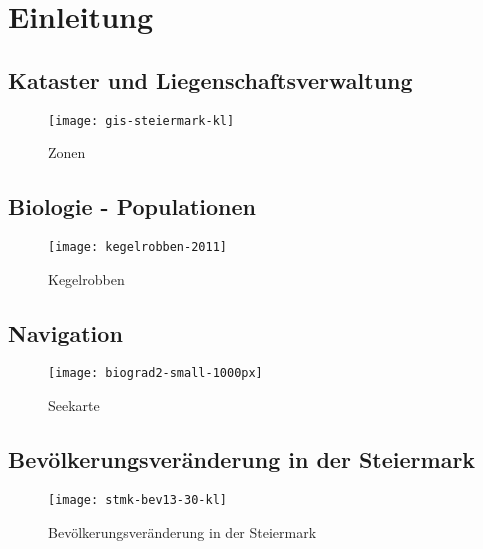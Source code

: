 \documentclass[11pt,fleqn]{book} %
\begin{document}
\pagestyle{empty} %

\tableofcontents %

\cleardoublepage %

\pagestyle{fancy} %



\chapter{Einleitung}


\section{Kataster und Liegenschaftsverwaltung}

\begin{figure}[h]
\centering
\texttt{[image: gis-steiermark-kl]}
\caption{Zonen}
\end{figure}

\section{Biologie - Populationen}
\begin{figure}[h]
\centering
\texttt{[image: kegelrobben-2011]}
\caption{Kegelrobben}
\end{figure}

\section{Navigation}
\begin{figure}[h]
\centering
\texttt{[image: biograd2-small-1000px]}
\caption{Seekarte}
\end{figure}

\section{Bev\"olkerungsver\"anderung in der Steiermark}
\begin{figure}[h]
\centering
\texttt{[image: stmk-bev13-30-kl]}
\caption{Bev\"olkerungsver\"anderung in der Steiermark}
\end{figure}
\end{document}
